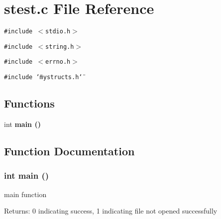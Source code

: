 \section{stest.c File Reference}
\label{stest_8c}
{\tt \#include $<$stdio.h$>$}\par
{\tt \#include $<$string.h$>$}\par
{\tt \#include $<$errno.h$>$}\par
{\tt \#include \char`\"{}mystructs.h\char`\"{}}\par
\subsection*{Functions}
\begin{CompactItemize}
\item 
int \bf{main} ()
\end{CompactItemize}


\subsection{Function Documentation}
\subsubsection{\setlength{\rightskip}{0pt plus 5cm}int main ()}\label{stest_8c_446c6b9a1a4dbab517fbb760870458a3}


main function \begin{Desc}
\item[Returns:]0 indicating success, 1 indicating file not opened successfully \end{Desc}
